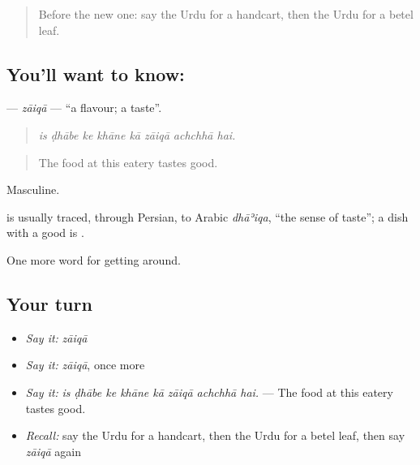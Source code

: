 \label{lesson:UR-C415-zaiqa}



\begin{quote}
Before the new one: say the Urdu for a handcart, then the Urdu for a betel leaf.
\end{quote}

\subsection*{You'll want to know: }
\textbf{} — \emph{zāiqā} — \textquotedblleft{}a flavour; a taste\textquotedblright{}.

\begin{quote}
       
\end{quote}

\begin{quote}
\emph{is ḍhābe ke khāne kā zāiqā achchhā hai.}
\end{quote}

\begin{quote}
The food at this eatery tastes good.
\end{quote}

Masculine.

\begin{cousinweb}
is usually traced, through Persian, to Arabic \emph{dhāʾiqa}, \textquotedblleft{}the sense of taste\textquotedblright{}; a dish with a good \textbf{} is \textbf{}.
\end{cousinweb}

\begin{grammarlens}[title={What you've built}]
One more word for getting around.
\end{grammarlens}

\subsection*{Your turn}
\begin{itemize}
\raggedright
  \item \emph{Say it:} \emph{zāiqā}
  \item \emph{Say it:} \emph{zāiqā}, once more
  \item \emph{Say it:} \emph{is ḍhābe ke khāne kā zāiqā achchhā hai.} — The food at this eatery tastes good.
  \item \emph{Recall:} say the Urdu for a handcart, then the Urdu for a betel leaf, then say \emph{zāiqā} again
\end{itemize}

